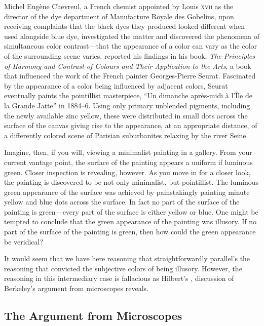 \documentclass[12pt]{article}
\begin{document}
Michel Eugène Chevreul, a French chemist appointed by Louis \textsc{xvii} as the director of the dye department of Manufacture Royale des Gobelins, upon receiving complaints that the black dyes they produced looked different when used alongside blue dye, investigated the matter and discovered the phenomena of simultaneous color contrast---that the appearance of a color can vary as the color of the surrounding scene varies. \citet{Chevreul:1855kx} reported his findings in his book, \emph{The Principles of Harmony and Contrast of Colours and Their Application to the Arts}, a book that influenced the work of the French painter Georges-Pierre Seurat. Fascinated by the appearance of a color being influenced by adjacent colors, Seurat eventually paints the pointillist masterpiece, “Un dimanche après-midi à l'Île de la Grande Jatte” in 1884--6. Using only primary unblended pigments, including the newly available zinc yellow, these were distributed in small dots across the surface of the canvas giving rise to the appearance, at an appropriate distance, of a differently colored scene of Parisian suburbanites relaxing by the river Seine.

Imagine, then, if you will, viewing a minimalist painting in a gallery. From your current vantage point, the surface of the painting appears a uniform if luminous green. Closer inspection is revealing, however. As you move in for a closer look, the painting is discovered to be not only minimalist, but pointillist. The luminous green appearance of the surface was achieved by painstakingly painting minute yellow and blue dots across the surface. In fact no part of the surface of the painting is green---every part of the surface is either yellow or blue. One might be tempted to conclude that the green appearance of the painting was illusory. If no part of the surface of the painting is green, then how could the green appearance be veridical? 

It would seem that we have here reasoning that straightforwardly parallel's the reasoning that convicted the subjective colors of being illusory. However, the reasoning in this intermediary case is fallacious as Hilbert's \citeyear[chapter 2]{Hilbert:1987jq}, discussion of Berkeley's \citeyear{Berkeley:1734fk} argument from microscopes reveals.


\subsection{The Argument from Microscopes}\label{sub:the_argument_from_microscopes} %
\end{document}
